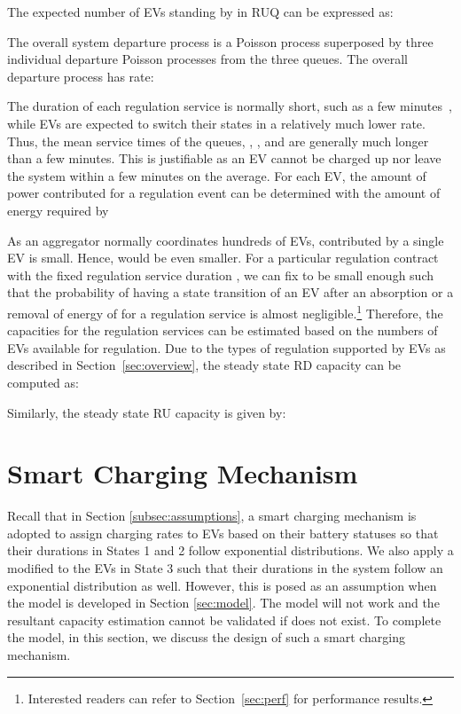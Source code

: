 \documentclass[journal]{IEEEtran}
\begin{document}
The expected number  of EVs standing by in RUQ can be expressed as:
{\small
 
}

The overall system departure process is a Poisson process superposed by three
individual departure Poisson processes from the three queues.  The overall
departure process has rate:


The duration of each regulation service  is normally short,
such as a few minutes~\cite{frequencyregulation}, while EVs are expected to
switch their states in a relatively much lower rate.  Thus, the mean service
times of the queues, , , and
 are generally much longer than a few minutes.  This is
justifiable as an EV cannot be charged up nor leave the system within a few
minutes on the average.  For each EV, the amount of power  contributed
for a regulation event can be determined with the amount of energy required
 by 

As an aggregator normally coordinates hundreds of EVs,  contributed by
a single EV is small.  Hence,  would be even smaller.  For a
particular regulation contract with the fixed regulation service duration
, we can fix  to be small enough such that the
probability of having a state transition of an EV after an absorption or a
removal of energy of  for a regulation service is almost
negligible.\footnote{Interested readers can refer to Section~\ref{sec:perf}
for performance results.}  Therefore, the capacities for the regulation
services can be estimated based on the numbers of EVs available for regulation.
Due to the types of regulation supported by EVs as described in
Section~\ref{sec:overview}, the steady state RD capacity 
 can be computed as:

Similarly, the steady state RU capacity  is given by:



\section{Smart Charging Mechanism} \label{sec:scm}

Recall that in Section \ref{subsec:assumptions}, a smart charging mechanism  is adopted to assign charging rates to  EVs based on their battery statuses so that their durations in States 1 and 2 follow exponential distributions. We also apply a modified  to the EVs in State 3 such that their durations in the system follow an exponential distribution as well. 
However, this  is posed as an assumption when the model is developed in Section \ref{sec:model}. The model will not work and the resultant capacity estimation cannot be validated if  does not exist. To complete the model, in this section, we discuss the design of such a smart charging mechanism.
\end{document}
